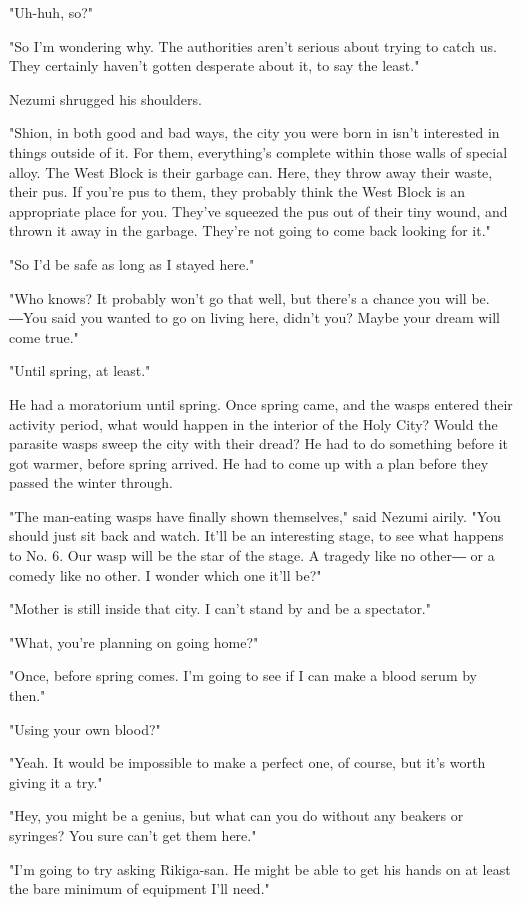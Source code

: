 "Uh-huh, so?"

"So I'm wondering why. The authorities aren't serious about trying to
catch us. They certainly haven't gotten desperate about it, to say the
least."

Nezumi shrugged his shoulders.

"Shion, in both good and bad ways, the city you were born in isn't
interested in things outside of it. For them, everything's complete
within those walls of special alloy. The West Block is their garbage
can. Here, they throw away their waste, their pus. If you're pus to
them, they probably think the West Block is an appropriate place for
you. They've squeezed the pus out of their tiny wound, and thrown it
away in the garbage. They're not going to come back looking for it."

"So I'd be safe as long as I stayed here."

"Who knows? It probably won't go that well, but there's a chance you
will be. ―You said you wanted to go on living here, didn't you? Maybe
your dream will come true."

"Until spring, at least."

He had a moratorium until spring. Once spring came, and the wasps
entered their activity period, what would happen in the interior of the
Holy City? Would the parasite wasps sweep the city with their dread? He
had to do something before it got warmer, before spring arrived. He had
to come up with a plan before they passed the winter through.

"The man-eating wasps have finally shown themselves," said Nezumi
airily. "You should just sit back and watch. It'll be an interesting
stage, to see what happens to No. 6. Our wasp will be the star of the
stage. A tragedy like no other― or a comedy like no other. I wonder
which one it'll be?"

"Mother is still inside that city. I can't stand by and be a spectator."

"What, you're planning on going home?"

"Once, before spring comes. I'm going to see if I can make a blood serum
by then."

"Using your own blood?"

"Yeah. It would be impossible to make a perfect one, of course, but it's
worth giving it a try."

"Hey, you might be a genius, but what can you do without any beakers or
syringes? You sure can't get them here."

"I'm going to try asking Rikiga-san. He might be able to get his hands
on at least the bare minimum of equipment I'll need."

